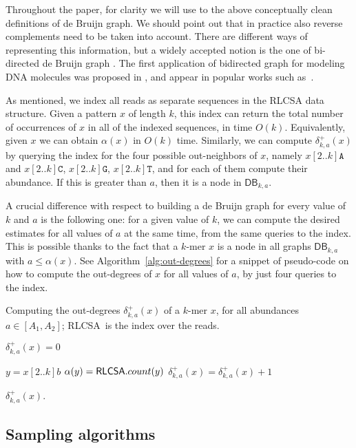 \documentclass[a4paper,11pt]{article}
\newcommand{\DB}{\mathsf{DB}_{k,a}}
\newcommand{\dplus}{\delta^+_{k,a}}
\newcommand{\abu}{\alpha}
\newcommand{\RLCSA}{{\sf RLCSA}}
\renewcommand{\leq}{\leqslant}
\begin{document}
Throughout the paper, for clarity we will use to the above conceptually clean definitions of de Bruijn graph. We should point out that in practice also reverse complements need to be taken into account. There are different ways of representing this information, but a widely accepted notion is the one of bi-directed de Bruijn graph \cite{DBLP:conf/wabi/MedvedevGMB07}. The first application of bidirected graph for modeling DNA molecules was proposed in \cite{Kececioglu:1992aa}, and appear in popular works such as~\cite{DBLP:journals/bioinformatics/DrezenRCDLPL14}. 

As mentioned, we index all reads as separate sequences in the RLCSA data structure. Given a pattern $x$ of length $k$, this index can return the total number of occurrences of $x$ in all of the indexed sequences, in time $O(k)$. Equivalently, given $x$ we can obtain $\alpha(x)$ in $O(k)$ time. Similarly, we can compute $\dplus(x)$ by querying the index for the four possible out-neighbors of $x$, namely $x[2..k]\mathtt{A}$ and $x[2..k]\mathtt{C}$, $x[2..k]\mathtt{G}$, $x[2..k]\mathtt{T}$, and for each of them compute their abundance. If this is greater than $a$, then it is a node in $\DB$.

A crucial difference with respect to building a de Bruijn graph for every value of $k$ and $a$ is the following one: for a given value of $k$, we can compute the desired estimates for all values of $a$ at the same time, from the same queries to the index. This is possible thanks to the fact that a $k$-mer $x$ is a node in all graphs $\DB$ with $a \leq \abu(x)$. See Algorithm~\ref{alg:out-degrees} for a snippet of pseudo-code on how to compute the out-degrees of $x$ for all values of $a$, by just four queries to the index.

\begin{algorithm}[h]
\caption{Computing the out-degrees $\dplus(x)$ of a $k$-mer $x$, for all abundances $a \in [A_1,A_2]$; \RLCSA\ is the index over the reads.\label{alg:out-degrees}}

{
	$\dplus(x) = 0$\;
}

{
	$y = x[2..k]b$\;
	$\abu(y) = \RLCSA.count(y)$\;
	\For{$a = A_1$ {\rm\bf to} $\min(\abu(y),A_2)$}
	{
		$\dplus(x) = \dplus(x) + 1$\;
	}
}

\Return $\dplus(x)$.
\end{algorithm}

\subsection{Sampling algorithms} %
\label{sub:algorithm}
\end{document}
